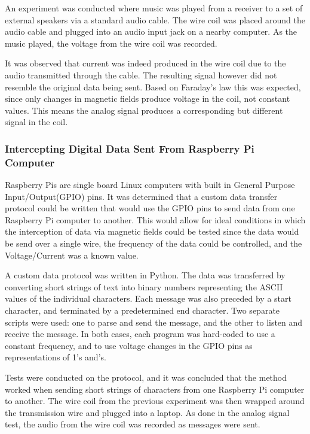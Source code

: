\documentclass{article}
\begin{document}
An experiment was conducted where music was played from a receiver to a set of external speakers via a standard audio cable. The wire coil was placed around the audio cable and plugged into an audio input jack on a nearby computer. As the music played, the voltage from the wire coil was recorded.

It was observed that current was indeed produced in the wire coil due to the audio transmitted through the cable. The resulting signal however did not resemble the original data being sent. Based on Faraday's law this was expected, since only changes in magnetic fields produce voltage in the coil, not constant values. This means the analog signal produces a corresponding but different signal in the coil.

\subsubsection{Intercepting Digital Data Sent From Raspberry Pi Computer}

Raspberry Pis are single board Linux computers with built in General Purpose Input/Output(GPIO) pins. It was determined that a custom data transfer protocol could be written that would use the GPIO pins to send data from one Raspberry Pi computer to another. This would allow for ideal conditions in which the interception of data via magnetic fields could be tested since the data would be send over a single wire, the frequency of the data could be controlled, and the Voltage/Current was a known value.

A custom data protocol was written in Python. The data was transferred by converting short strings of text into binary numbers representing the ASCII values of the individual characters. Each message was also preceded by a start character, and terminated by a predetermined end character. Two separate scripts were used: one to parse and send the message, and the other to listen and receive the message. In both cases, each program was hard-coded to use a constant frequency, and to use voltage changes in the GPIO pins as representations of 1\textquoteright s and\textquoteright s.

Tests were conducted on the protocol, and it was concluded that the method worked when sending short strings of characters from one Raspberry Pi computer to another. The wire coil from the previous experiment was then wrapped around the transmission wire and plugged into a laptop. As done in the analog signal test, the audio from the wire coil was recorded as messages were sent.
\end{document}

